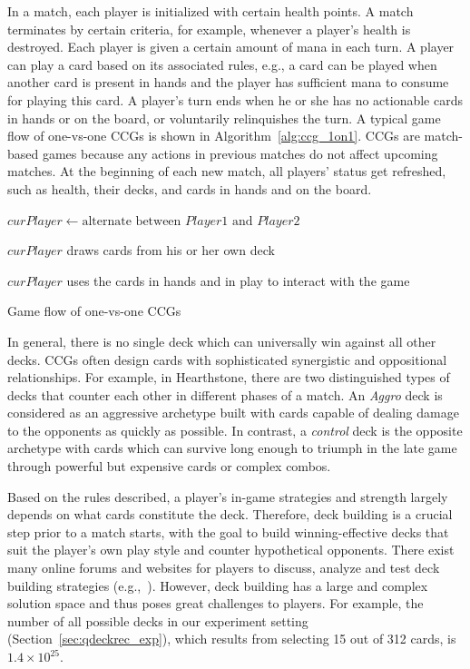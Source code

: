 In a match, each player is initialized with certain health points. A match terminates by certain criteria, for example, whenever a player's health is destroyed. Each player is given a certain amount of mana in each turn. A player can play a card based on its associated rules, e.g., a card can be played when another card is present in hands and the player has sufficient mana to consume for playing this card. A player's turn ends when he or she has no actionable cards in hands or on the board, or voluntarily relinquishes the turn. A typical game flow of one-vs-one CCGs is shown in Algorithm~\ref{alg:ccg_1on1}. CCGs are match-based games because any actions in previous matches do not affect upcoming matches. At the beginning of each new match, all players' status get refreshed, such as health, their decks, and cards in hands and on the board.


\begin{algorithm}
    \BlankLine
    
     {
    \BlankLine
	$curPlayer \leftarrow \text{alternate between } Player1 \text{ and } Player 2$ 
    
    \BlankLine
	$curPlayer$ draws cards from his or her own deck  
 
  	\BlankLine
    $curPlayer$ uses the cards in hands and in play to interact with the game
   		
  	\BlankLine 	
    }
    \caption{Game flow of one-vs-one CCGs}
    \label{alg:ccg_1on1}
\end{algorithm}

In general, there is no single deck which can universally win against all other decks. CCGs often design cards with sophisticated synergistic and oppositional relationships. For example, in Hearthstone, there are two distinguished types of decks that counter each other in different phases of a match. An \textit{Aggro} deck is considered as an aggressive archetype built with cards capable of dealing damage to the opponents as quickly as possible. In contrast, a \textit{control} deck is the opposite archetype with cards which can survive long enough to triumph in the late game through powerful but expensive cards or complex combos.

Based on the rules described, a player's in-game strategies and strength largely depends on what cards constitute the deck. Therefore, deck building is a crucial step prior to a match starts, with the goal to build winning-effective decks that suit the player's own play style and counter hypothetical opponents. There exist many online forums and websites for players to discuss, analyze and test deck building strategies (e.g.,~\cite{hearthpwn,icyveins}). However, deck building has a large and complex solution space and thus poses great challenges to players. For example, the number of all possible decks in our experiment setting (Section~\ref{sec:qdeckrec_exp}), which results from selecting 15 out of 312 cards, is $1.4 \times 10^{25}$. 

